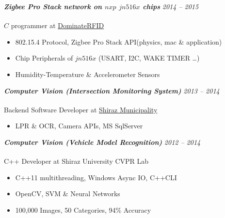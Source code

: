 \documentclass{article}
\newcommand{\hh}[1]{\large{\textit{\textbf{#1}}}}
\renewcommand{\i}[1]{\normalsize{\textit{#1}}}
\begin{document}

\hh{Zigbee Pro Stack network on $nxp$ $jn516x$ chips} \hfill \i{2014 -- 2015} \\ \vspace{-.35cm} \\
$C$ programmer at \href{http://www.dominaterfid.com/}{DominateRFID} \\ \vspace{-.9cm}
\begin{itemize}
 \setlength{\itemsep}{1pt} \setlength{\parskip}{0pt} \setlength{\parsep}{0pt}
    \item 802.15.4 Protocol, Zigbee Pro Stack API(physics, mac \& application)
    \item Chip Peripherals of $jn516x$ (USART, I2C, WAKE TIMER \dots)
    \item Humidity-Temperature \& Accelerometer Sensors
\end{itemize}

\hh{Computer Vision (Intersection Monitoring System)} \hfill \i{2013 -- 2014} \\ \vspace{-.35cm} \\
Backend Software Developer at \href{https://portal.shiraz.ir/}{Shiraz Municipality} \\ \vspace {-.90cm}
\begin{itemize}
 \setlength{\itemsep}{1pt} \setlength{\parskip}{0pt} \setlength{\parsep}{0pt}
 \item LPR \& OCR, Camera APIs, MS SqlServer
\end{itemize}

\hh{Computer Vision (Vehicle Model Recognition)} \hfill \i{2012 -- 2014} \\ \vspace{-.35cm} \\
C++ Developer at Shiraz University CVPR Lab \\ \vspace{-.9cm}
\begin{itemize}
 \setlength{\itemsep}{1pt} \setlength{\parskip}{0pt} \setlength{\parsep}{0pt}
 \item C++11 multithreading, Windows Async IO, C++\/CLI
 \item OpenCV, SVM \& Neural Networks
 \item 100,000 Images, 50 Categories, 94\% Accuracy
\end{itemize}
\end{document}
